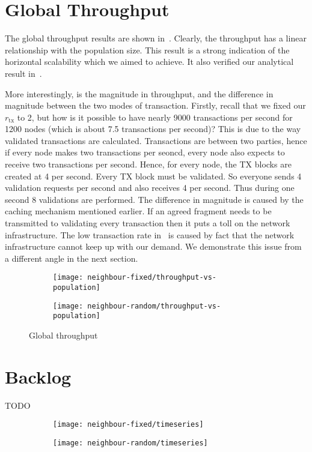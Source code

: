 \section{Global Throughput}
The global throughput results are shown in~.
Clearly, the throughput has a linear relationship with the population size.
This result is a strong indication of the horizontal scalability which we aimed to achieve.
It also verified our analytical result in~.

More interestingly, is the magnitude in throughput, 
and the difference in magnitude between the two modes of transaction.
Firstly, recall that we fixed our $r_\text{tx}$ to 2, but how is it possible to have nearly 9000 transactions per second for 1200 nodes (which is about 7.5 transactions per second)?
This is due to the way validated transactions are calculated.
Transactions are between two parties, hence if every node makes two transactions per seoncd,
every node also expects to receive two transactions per second.
Hence, for every node, the TX blocks are created at 4 per second.
Every TX block must be validated.
So everyone sends 4 validation requests per second and also receives 4 per second.
Thus during one second 8 validations are performed.
The difference in magnitude is caused by the caching mechanism mentioned earlier.
If an agreed fragment needs to be transmitted to validating every transaction then it puts a toll on the network infrastructure.
The low transaction rate in~ is caused by fact that the network infrastructure cannot keep up with our demand.
We demonstrate this issue from a different angle in the next section.

\begin{figure}[h]
  \centering
  \begin{subfigure}{\textwidth}
    \texttt{[image: neighbour-fixed/throughput-vs-population]}
    \label{fig:global-throughput-fixed}
  \end{subfigure}

  \begin{subfigure}{\textwidth}
    \texttt{[image: neighbour-random/throughput-vs-population]}
    \label{fig:global-throughput-random}
  \end{subfigure}
  \caption{Global throughput}
  \label{fig:global-throughput}
\end{figure}



\section{Backlog}

TODO

\begin{figure}[h]
  \centering
  \begin{subfigure}{\textwidth}
    \texttt{[image: neighbour-fixed/timeseries]}
  \end{subfigure}

  \begin{subfigure}{\textwidth}
    \texttt{[image: neighbour-random/timeseries]}
  \end{subfigure}
\end{figure}